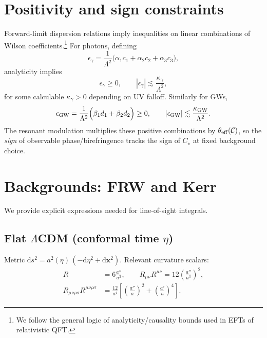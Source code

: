 \documentclass[%
 reprint,
 amsmath,amssymb,
 aps,
 pra,
 longbibliography,
 nofootinbib
]{revtex4-2}
\newcommand{\dd}{\mathrm{d}}
\begin{document}
\section{Positivity and sign constraints}
\label{sec:positivity}
Forward-limit dispersion relations imply inequalities on linear combinations of Wilson coefficients.\footnote{We follow the general logic of analyticity/causality bounds used in EFTs of relativistic QFT.}
For photons, defining
\begin{equation}
\epsilon_\gamma = \frac{1}{\Lambda^2}\Big(\alpha_1 c_1 + \alpha_2 c_2 + \alpha_3 c_3\Big),
\end{equation}
analyticity implies
\begin{equation}
\epsilon_\gamma \ge 0,
\qquad
|\epsilon_\gamma| \lesssim \frac{\kappa_\gamma}{\Lambda^2},
\label{eq:epsgamma-pos}
\end{equation}
for some calculable $\kappa_\gamma>0$ depending on UV falloff.
Similarly for GWs,
\begin{equation}
\epsilon_{\rm GW}
= \frac{1}{\Lambda^2}\Big(\beta_1 d_1 + \beta_2 d_2\Big)\ge 0,
\qquad
|\epsilon_{\rm GW}|\lesssim \frac{\kappa_{\rm GW}}{\Lambda^2}.
\label{eq:epsgw-pos}
\end{equation}
The resonant modulation multiplies these positive combinations by $\theta_{\rm eff}(\mathcal{C})$, so the \emph{sign} of observable phase/birefringence tracks the sign of $C_\star$ at fixed background choice.

\section{Backgrounds: FRW and Kerr}
\label{sec:backgrounds}
We provide explicit expressions needed for line-of-sight integrals.

\subsection{Flat $\Lambda$CDM (conformal time $\eta$)}
\label{sec:frw}
Metric $\dd s^2=a^2(\eta)\,(-\dd \eta^2+\dd \boldsymbol{x}^2)$.
Relevant curvature scalars:
\begin{align}
R &= 6\frac{a''}{a^3},\qquad
R_{\mu\nu}R^{\mu\nu}=12\left(\frac{a''}{a^3}\right)^2,\\
R_{\mu\nu\rho\sigma}R^{\mu\nu\rho\sigma}
&= \frac{12}{a^4}\left[\left(\frac{a''}{a}\right)^2+\left(\frac{a'}{a}\right)^4\right].
\end{align}
\end{document}
